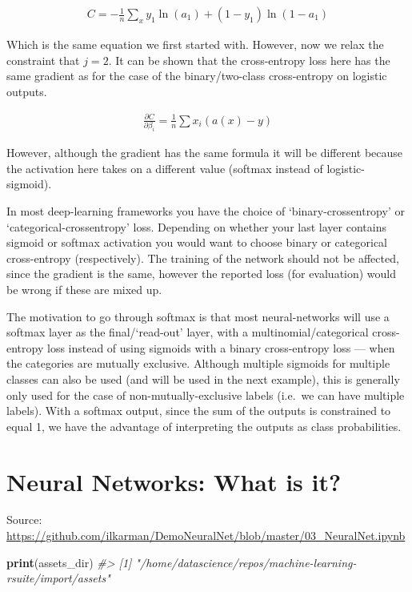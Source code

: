 \documentclass[]{book}
\newenvironment{Shaded}{\begin{snugshade}}{\end{snugshade}}
\newcommand{\CommentTok}[1]{\textcolor[rgb]{0.56,0.35,0.01}{\textit{#1}}}
\newcommand{\KeywordTok}[1]{\textcolor[rgb]{0.13,0.29,0.53}{\textbf{#1}}}
\newcommand{\NormalTok}[1]{#1}
\begin{document}
\[\begin{aligned} 
   C = -\frac{1}{n}\sum_xy_1\ln(a_1) + (1 - y_1)\ln(1-a_1)
\end{aligned}\]

Which is the same equation we first started with. However, now we relax the constraint that
\(j=2\). It can be shown that the cross-entropy loss here has the same gradient as for the case of the binary/two-class cross-entropy on logistic outputs.

\[\begin{aligned} 
   \frac {\partial C} {\partial \beta_i} = \frac {1}{n} \sum x_i(a(x) -y)
\end{aligned}\]

However, although the gradient has the same formula it will be different because the activation here takes on a different value (softmax instead of logistic-sigmoid).

In most deep-learning frameworks you have the choice of `binary-crossentropy' or `categorical-crossentropy' loss. Depending on whether your last layer contains sigmoid or softmax activation you would want to choose binary or categorical cross-entropy (respectively). The training of the network should not be affected, since the gradient is the same, however the reported loss (for evaluation) would be wrong if these are mixed up.

The motivation to go through softmax is that most neural-networks will use a softmax layer as the final/`read-out' layer, with a multinomial/categorical cross-entropy loss instead of using sigmoids with a binary cross-entropy loss --- when the categories are mutually exclusive. Although multiple sigmoids for multiple classes can also be used (and will be used in the next example), this is generally only used for the case of non-mutually-exclusive labels (i.e.~we can have multiple labels). With a softmax output, since the sum of the outputs is constrained to equal 1, we have the advantage of interpreting the outputs as class probabilities.

\hypertarget{neural-networks-what-is-it}{%
\chapter{Neural Networks: What is it?}\label{neural-networks-what-is-it}}

Source: \url{https://github.com/ilkarman/DemoNeuralNet/blob/master/03_NeuralNet.ipynb}

\begin{Shaded}
\begin{Highlighting}[]
\KeywordTok{print}\NormalTok{(assets_dir)}
\CommentTok{#> [1] "/home/datascience/repos/machine-learning-rsuite/import/assets"}
\end{Highlighting}
\end{Shaded}
\end{document}
